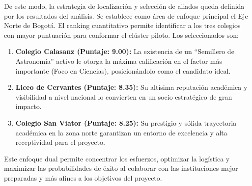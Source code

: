 \begin{table}[h!]
\centering
\caption{Matriz de Evaluación de Microlocalización (Selección de Colegios).}
\label{tab:micro_colegios}
\end{table}

De este modo, la estrategia de localización y selección de aliados queda definida por los resultados del análisis. Se establece como área de enfoque principal el Eje Norte de Bogotá. El ranking cuantitativo permite identificar a los tres colegios con mayor puntuación para conformar el clúster piloto. Los seleccionados son:
\begin{enumerate}
    \item \textbf{Colegio Calasanz (Puntaje: 9.00):} La existencia de un ``Semillero de Astronomía'' activo le otorga la máxima calificación en el factor más importante (Foco en Ciencias), posicionándolo como el candidato ideal.
    \item \textbf{Liceo de Cervantes (Puntaje: 8.35):} Su altísima reputación académica y visibilidad a nivel nacional lo convierten en un socio estratégico de gran impacto.
    \item \textbf{Colegio San Viator (Puntaje: 8.25):} Su prestigio y sólida trayectoria académica en la zona norte garantizan un entorno de excelencia y alta receptividad para el proyecto.
\end{enumerate}
Este enfoque dual permite concentrar los esfuerzos, optimizar la logística y maximizar las probabilidades de éxito al colaborar con las instituciones mejor preparadas y más afines a los objetivos del proyecto.
